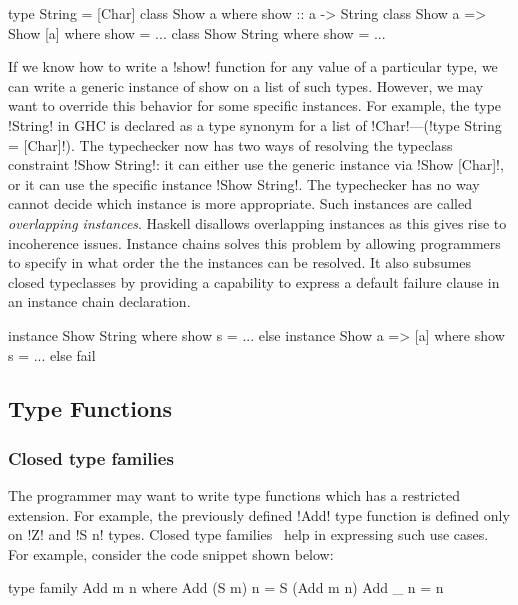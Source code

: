 \documentclass[screen,nonacm,manuscript,review]{acmart} %
\begin{document}
\begin{CenteredBox}
\begin{code}
type String = [Char]
class Show a where show :: a -> String
class Show a => Show [a] where show = ...
class Show String where show = ...
\end{code}
\end{CenteredBox}
If we know how to write a !show! function for any value of a particular
type, we can write a generic instance of show on a list of such types.
However, we may want to override this behavior for some specific
instances. For example, the type !String! in GHC is declared as a
type synonym for a list of !Char!---(!type String = [Char]!).
The typechecker now has two ways of resolving the typeclass
constraint !Show String!: it can either use the generic instance via
!Show [Char]!, or it can use the specific instance !Show String!. The
typechecker has no way cannot decide which instance is more appropriate.
Such instances are called \emph{overlapping instances}.
Haskell disallows overlapping instances as this gives rise to
incoherence issues\cite{jones_coherence_1993}.
Instance chains solves this problem by allowing programmers
to specify in what order the the instances can be resolved. It also
subsumes closed typeclasses by providing a capability to express
a default failure clause in an instance chain declaration.

\begin{CenteredBox}
\begin{code}
instance Show String where show s = ...
else instance Show a => [a] where show s = ...
else fail
\end{code}
\end{CenteredBox}

\subsection{Type Functions}\label{sec:rw-type-fun}
\subsubsection{Closed type families}
The programmer may want to write type functions which has a restricted
extension. For example, the previously defined !Add! type
function is defined only on !Z! and !S n! types. Closed type
families~\cite{eisenberg_typefamilies_2014} help in
expressing such use cases. For example, consider the code snippet shown below:

\begin{CenteredBox}
\begin{code}
type family Add m n where
  Add (S m) n = S (Add m n)
  Add _ n = n
\end{code}
\end{CenteredBox}
\end{document}
